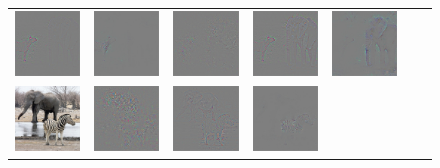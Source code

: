 \begin{figure}
\begin{center}
\begin{tabular}{c||ccc||ccc}
\includegraphics[width=0.13\linewidth]{figs/examples/googlenet/deconv/zeb-ele1_diff_341} &
\includegraphics[width=0.13\linewidth]{figs/examples/googlenet/soft/zeb-ele1_diff_341} &
\includegraphics[width=0.13\linewidth]{figs/examples/googlenet/oxford/zeb-ele1_diff_387} &
\includegraphics[width=0.13\linewidth]{figs/examples/googlenet/deconv/zeb-ele1_diff_387} &
\includegraphics[width=0.13\linewidth]{figs/examples/googlenet/soft/zeb-ele1_diff_387} \\
\includegraphics[width=0.13\linewidth]{figs/examples/googlenet/oxford/zeb-ele2} &
\includegraphics[width=0.13\linewidth]{figs/examples/googlenet/oxford/zeb-ele2_diff_341} &
\includegraphics[width=0.13\linewidth]{figs/examples/googlenet/deconv/zeb-ele2_diff_341} &
\includegraphics[width=0.13\linewidth]{figs/examples/googlenet/soft/zeb-ele2_diff_341} &

\end{tabular}
\end{center}
\end{figure}
